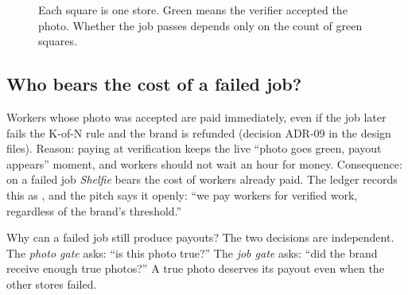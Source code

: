 \begin{figure}[htbp]
\centering
{}
\caption{Each square is one store. Green means the verifier accepted the photo. Whether the job passes depends only on the count of green squares.}
\end{figure}

\subsection{Who bears the cost of a failed job?}
Workers whose photo was accepted are paid immediately, even if the job later fails the K-of-N rule and the brand is refunded (decision ADR-09 in the design files). Reason: paying at verification keeps the live ``photo goes green, payout appears'' moment, and workers should not wait an hour for money. Consequence: on a failed job \emph{Shelfie} bears the cost of workers already paid. The ledger records this as , and the pitch says it openly: ``we pay workers for verified work, regardless of the brand's threshold.''

\begin{conceptbox}{Why can a failed job still produce payouts?}
The two decisions are independent. The \emph{photo gate} asks: ``is this photo true?'' The \emph{job gate} asks: ``did the brand receive enough true photos?'' A true photo deserves its payout even when the other stores failed.
\end{conceptbox}

